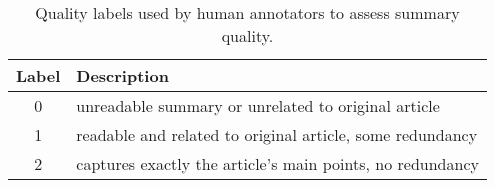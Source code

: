 \begin{table}
    \centering
    \caption{Quality labels used by human annotators to assess summary quality.}
    \label{quality-levels}
    \begin{tabular}{cl}
        \toprule
        Label & Description \\
        \midrule
        0 & unreadable summary or unrelated to original article \\
        1 & readable and related to original article, some redundancy \\
        2 & captures exactly the article's main points, no redundancy \\
        \bottomrule
    \end{tabular}
\end{table}